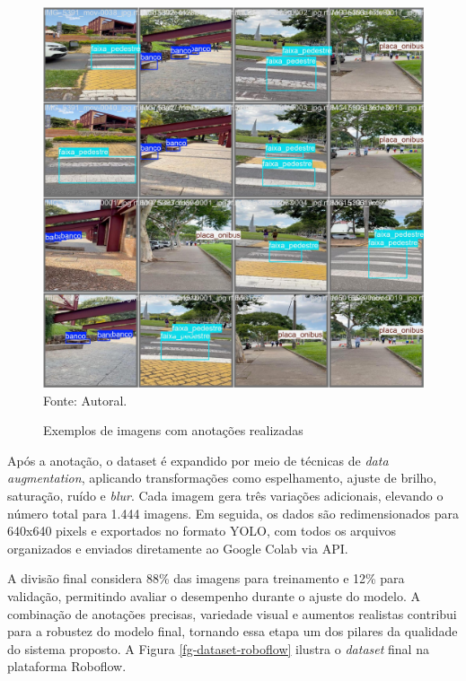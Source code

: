 \begin{figure}[htbp]
  \centering
  \caption{Exemplos de imagens com anotações realizadas}
  \includegraphics[width=1 \textwidth]{Figuras/val_batch2_labels.jpg}
  \\
  Fonte: Autoral.
  \label{fg-ex_anot3}
\end{figure}

Após a anotação, o dataset é expandido por meio de técnicas de \textit{data augmentation}, aplicando transformações como espelhamento, ajuste de brilho, saturação, ruído e \textit{blur}. Cada imagem gera três variações adicionais, elevando o número total para 1.444 imagens. Em seguida, os dados são redimensionados para 640x640 pixels e exportados no formato YOLO, com todos os arquivos organizados e enviados diretamente ao Google Colab via API.

A divisão final considera 88\% das imagens para treinamento e 12\% para validação, permitindo avaliar o desempenho durante o ajuste do modelo. A combinação de anotações precisas, variedade visual e aumentos realistas contribui para a robustez do modelo final, tornando essa etapa um dos pilares da qualidade do sistema proposto. A Figura \ref{fg-dataset-roboflow} ilustra o \textit{dataset} final na plataforma Roboflow.

